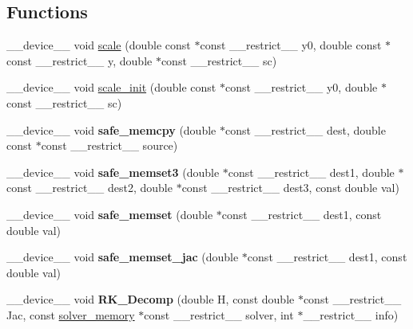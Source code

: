 \subsection*{Functions}
\begin{DoxyCompactItemize}
\item 
\+\_\+\+\_\+device\+\_\+\+\_\+ void \hyperlink{radau2a_8cu_a4fab5866449108992478041d2e51a28c}{scale} (double const $\ast$const \+\_\+\+\_\+restrict\+\_\+\+\_\+ y0, double const $\ast$const \+\_\+\+\_\+restrict\+\_\+\+\_\+ y, double $\ast$const \+\_\+\+\_\+restrict\+\_\+\+\_\+ sc)
\item 
\+\_\+\+\_\+device\+\_\+\+\_\+ void \hyperlink{radau2a_8cu_a27a28cde87f3cbaf5f6adb19550a09a0}{scale\+\_\+init} (double const $\ast$const \+\_\+\+\_\+restrict\+\_\+\+\_\+ y0, double $\ast$const \+\_\+\+\_\+restrict\+\_\+\+\_\+ sc)
\item 
\+\_\+\+\_\+device\+\_\+\+\_\+ void {\bfseries safe\+\_\+memcpy} (double $\ast$const \+\_\+\+\_\+restrict\+\_\+\+\_\+ dest, double const $\ast$const \+\_\+\+\_\+restrict\+\_\+\+\_\+ source)\hypertarget{radau2a_8cu_a3fe24b23317653f271f22f62bf2fd17f}{}\label{radau2a_8cu_a3fe24b23317653f271f22f62bf2fd17f}

\item 
\+\_\+\+\_\+device\+\_\+\+\_\+ void {\bfseries safe\+\_\+memset3} (double $\ast$const \+\_\+\+\_\+restrict\+\_\+\+\_\+ dest1, double $\ast$const \+\_\+\+\_\+restrict\+\_\+\+\_\+ dest2, double $\ast$const \+\_\+\+\_\+restrict\+\_\+\+\_\+ dest3, const double val)\hypertarget{radau2a_8cu_a8f00fd7d5d5da97d7faf474fcf545a6a}{}\label{radau2a_8cu_a8f00fd7d5d5da97d7faf474fcf545a6a}

\item 
\+\_\+\+\_\+device\+\_\+\+\_\+ void {\bfseries safe\+\_\+memset} (double $\ast$const \+\_\+\+\_\+restrict\+\_\+\+\_\+ dest1, const double val)\hypertarget{radau2a_8cu_aacde6c2050e1700429cc99df1cba83df}{}\label{radau2a_8cu_aacde6c2050e1700429cc99df1cba83df}

\item 
\+\_\+\+\_\+device\+\_\+\+\_\+ void {\bfseries safe\+\_\+memset\+\_\+jac} (double $\ast$const \+\_\+\+\_\+restrict\+\_\+\+\_\+ dest1, const double val)\hypertarget{radau2a_8cu_af04ced8f6b4fa62baf8371338878f408}{}\label{radau2a_8cu_af04ced8f6b4fa62baf8371338878f408}

\item 
\+\_\+\+\_\+device\+\_\+\+\_\+ void {\bfseries R\+K\+\_\+\+Decomp} (double H, const double $\ast$const \+\_\+\+\_\+restrict\+\_\+\+\_\+ Jac, const \hyperlink{structsolver__memory}{solver\+\_\+memory} $\ast$const \+\_\+\+\_\+restrict\+\_\+\+\_\+ solver, int $\ast$\+\_\+\+\_\+restrict\+\_\+\+\_\+ info)\hypertarget{radau2a_8cu_adbea49bbab9b7a7f94204cc771919860}{}\label{radau2a_8cu_adbea49bbab9b7a7f94204cc771919860}


\end{DoxyCompactItemize}
